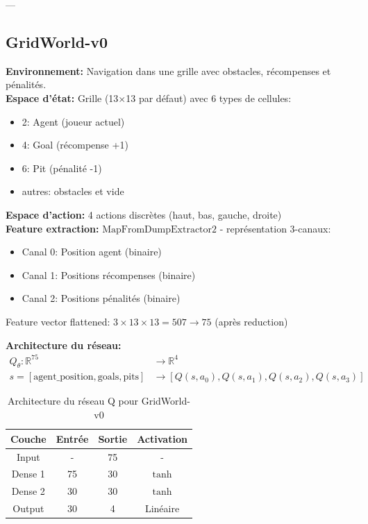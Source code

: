 ---

\subsection{GridWorld-v0}

\textbf{Environnement:} Navigation dans une grille avec obstacles, récompenses et pénalités. \\
\textbf{Espace d'état:} Grille (13×13 par défaut) avec 6 types de cellules:
\begin{itemize}
    \item 2: Agent (joueur actuel)
    \item 4: Goal (récompense +1)
    \item 6: Pit (pénalité -1)
    \item autres: obstacles et vide
\end{itemize}

\textbf{Espace d'action:} 4 actions discrètes (haut, bas, gauche, droite) \\
\textbf{Feature extraction:} $\text{MapFromDumpExtractor2}$ - représentation 3-canaux:
\begin{itemize}
    \item Canal 0: Position agent (binaire)
    \item Canal 1: Positions récompenses (binaire)
    \item Canal 2: Positions pénalités (binaire)
\end{itemize}

Feature vector flattened: $3 \times 13 \times 13 = 507 \to 75$ (après reduction)

\textbf{Architecture du réseau:}
\[
\begin{aligned}
Q_\theta : \mathbb{R}^{75} &\to \mathbb{R}^4 \\
s = [\text{agent\_position}, \text{goals}, \text{pits}] &\to [Q(s, a_0), Q(s, a_1), Q(s, a_2), Q(s, a_3)]
\end{aligned}
\]

\vspace{0.3cm}
\begin{table}[h!]
    \centering
    \begin{tabular}{|c|c|c|c|}
    \hline
    \textbf{Couche} & \textbf{Entrée} & \textbf{Sortie} & \textbf{Activation} \\
    \hline
    Input & - & 75 & - \\
    \hline
    Dense 1 & 75 & 30 & $\tanh$ \\
    \hline
    Dense 2 & 30 & 30 & $\tanh$ \\
    \hline
    Output & 30 & 4 & Linéaire \\
    \hline
    \end{tabular}
    \caption{Architecture du réseau Q pour GridWorld-v0}
\end{table}

